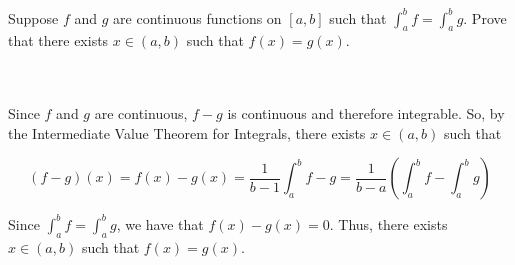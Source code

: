 Suppose $f$ and $g$ are continuous functions on $[a,b]$ such that $\int_a^bf=\int_a^bg$. Prove that
there exists $x\in(a,b)$ such that $f(x)=g(x)$.\\\\

\begin{solution}\renewcommand{\qedsymbol}{}\ \\
    Since $f$ and $g$ are continuous, $f-g$ is continuous and therefore integrable. So, by the
    Intermediate Value Theorem for Integrals, there exists $x\in(a,b)$ such that
    
    $$(f-g)(x)=f(x)-g(x)=\frac{1}{b-1}\int_a^bf-g=\frac{1}{b-a}(\int_a^bf-\int_a^bg)$$
    
    Since $\int_a^bf=\int_a^bg$, we have that $f(x)-g(x)=0$. Thus, there exists $x\in(a,b)$ such that
    $f(x)=g(x)$.

\end{solution}